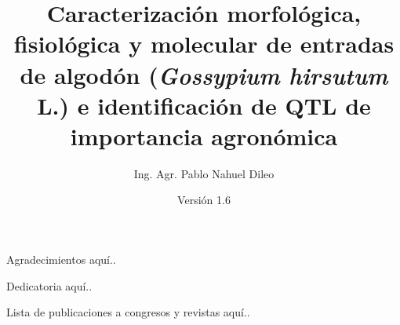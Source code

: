 \documentclass[12pt,oneside]{reedthesis}
\title{Caracterización morfológica, fisiológica y molecular de entradas de algodón (\emph{Gossypium hirsutum} L.) e identificación de QTL de importancia agronómica}
\author{Ing. Agr. Pablo Nahuel Dileo}
\date{Versión 1.6}
\begin{document}
\frontmatter 
\pagestyle{empty} %
\fancyfoot[R]{\thepage}

  \maketitle

  \begin{acknowledgements}
    Agradecimientos aquí..
    \thispagestyle{fancy} %
    \fancyhf{} %
    \fancyhead{} %
    \fancyfoot[R]{\thepage} %
  \end{acknowledgements}

  \begin{dedication}
    Dedicatoria aquí..
    \thispagestyle{fancy} %
    \fancyhf{} %
    \fancyhead{} %
    \fancyfoot[R]{\thepage} %
  \end{dedication}

  \begin{publications}
    Lista de publicaciones a congresos y revistas aquí..
    \thispagestyle{fancy} %
    \fancyhf{} %
    \fancyhead{} %
    \fancyfoot[R]{\thepage} %
  \end{publications}

  \hypersetup{linkcolor=black}
  \setcounter{secnumdepth}{2}
  \setcounter{tocdepth}{2}
  \tableofcontents
  \thispagestyle{fancy} %
    \fancyhf{} %
    \fancyhead{} %
    \fancyfoot[R]{\thepage} %
\end{document}
